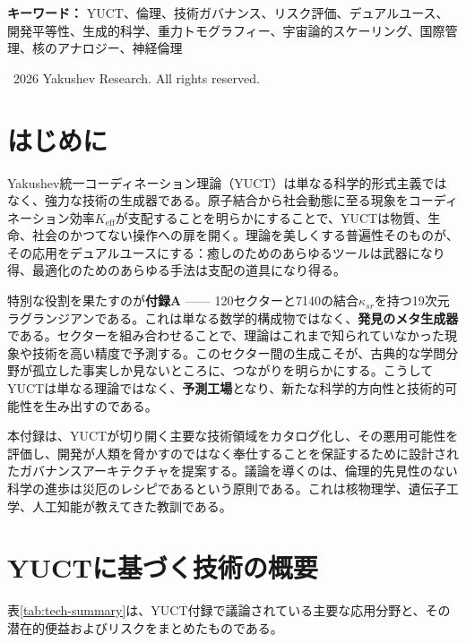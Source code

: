 \documentclass[12pt,a4paper]{article}
\theoremstyle{remark}
\newcommand{\Keff}{K_{\mathrm{eff}}}
\begin{document}
\begin{titlepage}
\begin{center}
			\vspace{1cm}
			
			\noindent
			\small\textbf{キーワード：} YUCT、倫理、技術ガバナンス、リスク評価、デュアルユース、開発平等性、生成的科学、重力トモグラフィー、宇宙論的スケーリング、国際管理、核のアナロジー、神経倫理
			
			\vspace{0.5cm}
			
			\noindent
			\textcopyright\ 2026 Yakushev Research. All rights reserved.
		\end{center}
	\end{titlepage}
	
	\tableofcontents
	\newpage
	
	\section{はじめに}
	\label{sec:intro}
	
	Yakushev統一コーディネーション理論（YUCT）は単なる科学的形式主義ではなく、強力な技術の生成器である。原子結合から社会動態に至る現象をコーディネーション効率\(\Keff\)が支配することを明らかにすることで、YUCTは物質、生命、社会のかつてない操作への扉を開く。理論を美しくする普遍性そのものが、その応用をデュアルユースにする：癒しのためのあらゆるツールは武器になり得、最適化のためのあらゆる手法は支配の道具になり得る。
	
	特別な役割を果たすのが\textbf{付録A} —— 120セクターと7140の結合\(\kappa_{sr}\)を持つ19次元ラグランジアンである。これは単なる数学的構成物ではなく、\textbf{発見のメタ生成器}である。セクターを組み合わせることで、理論はこれまで知られていなかった現象や技術を高い精度で予測する。このセクター間の生成こそが、古典的な学問分野が孤立した事実しか見ないところに、つながりを明らかにする。こうしてYUCTは単なる理論ではなく、\textbf{予測工場}となり、新たな科学的方向性と技術的可能性を生み出すのである。
	
	本付録は、YUCTが切り開く主要な技術領域をカタログ化し、その悪用可能性を評価し、開発が人類を脅かすのではなく奉仕することを保証するために設計されたガバナンスアーキテクチャを提案する。議論を導くのは、倫理的先見性のない科学の進歩は災厄のレシピであるという原則である。これは核物理学、遺伝子工学、人工知能が教えてきた教訓である。
	
	\section{YUCTに基づく技術の概要}
	\label{sec:overview}
	
	表\ref{tab:tech-summary}は、YUCT付録で議論されている主要な応用分野と、その潜在的便益およびリスクをまとめたものである。
	
\end{document}
